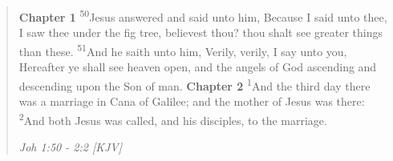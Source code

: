 \begin{quote}
\textbf{Chapter 1}
\textsuperscript{50}Jesus answered and said unto him, Because I said unto thee, I saw thee under the fig tree, believest thou? thou shalt see greater things than these.
\textsuperscript{51}And he saith unto him, Verily, verily, I say unto you, Hereafter ye shall see heaven open, and the angels of God ascending and descending upon the Son of man.
\textbf{Chapter 2}
\textsuperscript{1}And the third day there was a marriage in Cana of Galilee; and the mother of Jesus was there:
\textsuperscript{2}And both Jesus was called, and his disciples, to the marriage.
\begin{flushright}
\emph{Joh 1:50 - 2:2 [KJV]}
\end{flushright}
\end{quote}